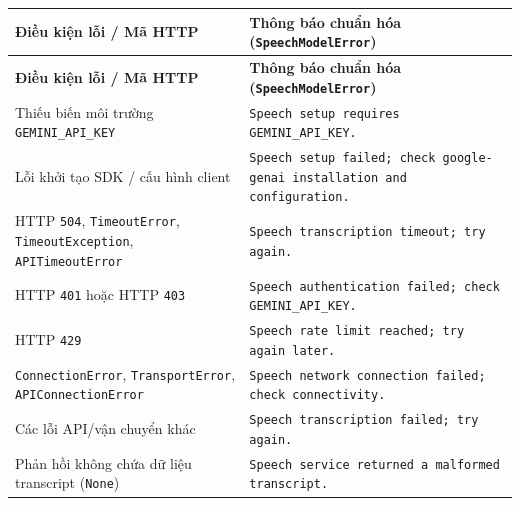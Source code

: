 \begin{longtable}{|p{}|p{}|}
\hline
\textbf{Điều kiện lỗi / Mã HTTP} & \textbf{Thông báo chuẩn hóa (\texttt{SpeechModelError})} \\
\hline
\endfirsthead
\hline
\textbf{Điều kiện lỗi / Mã HTTP} & \textbf{Thông báo chuẩn hóa (\texttt{SpeechModelError})} \\
\hline
\endhead
Thiếu biến môi trường \texttt{GEMINI\_API\_KEY} & \texttt{Speech setup requires GEMINI\_API\_KEY.} \\
\hline
Lỗi khởi tạo SDK / cấu hình client & \texttt{Speech setup failed; check google-genai installation and configuration.} \\
\hline
HTTP \texttt{504}, \texttt{TimeoutError}, \texttt{TimeoutException}, \texttt{APITimeoutError} & \texttt{Speech transcription timeout; try again.} \\
\hline
HTTP \texttt{401} hoặc HTTP \texttt{403} & \texttt{Speech authentication failed; check GEMINI\_API\_KEY.} \\
\hline
HTTP \texttt{429} & \texttt{Speech rate limit reached; try again later.} \\
\hline
\texttt{ConnectionError}, \texttt{TransportError}, \texttt{APIConnectionError} & \texttt{Speech network connection failed; check connectivity.} \\
\hline
Các lỗi API/vận chuyển khác & \texttt{Speech transcription failed; try again.} \\
\hline
Phản hồi không chứa dữ liệu transcript (\texttt{None}) & \texttt{Speech service returned a malformed transcript.} \\
\hline
\end{longtable}

